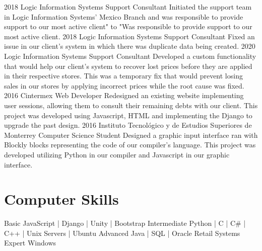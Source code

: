 \documentclass[]{twentysecondcv}
\begin{document}
\begin{twenty}
  \twentyitem
    {2018}
    {Logic Information Systems}
    {Support Consultant}
    {Initiated the support team in Logic Information Systems’ Mexico Branch and was responsible to provide support to our most active client" to "Was responsible to provide support to our most active client.}
  \twentyitem
    {2018}
    {Logic Information Systems}
    {Support Consultant}
    {Fixed an issue in our client’s system in which there was duplicate data being created.}
\twentyitem
    {2020}
    {Logic Information Systems}
    {Support Consultant}
    {Developed a custom functionality that would help our client’s system to recover lost prices before they are applied in their respective stores. This was a temporary fix that would prevent losing sales in our stores by applying incorrect prices while the root cause was fixed.}
\twentyitem
    {2016}
    {Cintermex}
    {Web Developer}
    {Redesigned an existing website implementing user sessions, allowing them to consult their remaining debts with our client. This project was developed using Javascript, HTML and implementing the Django to upgrade the past design.}
\twentyitem
    {2016}
    {Instituto Tecnológico y de Estudios Superiores de Monterrey}
    {Computer Science Student}
    {Designed a graphic input interface ran with Blockly blocks representing the code of our compiler's language. This project was developed utilizing Python in our compiler and Javascript in our graphic interface.}
\end{twenty}

\section{Computer Skills}

\begin{twentyshort}
  \twentyitemshort
    {Basic}
    {   JavaScript | Django | Unity | Bootstrap}
  \twentyitemshort
    {Intermediate}
    {   Python | C | C\# | C++ | Unix Servers | Ubuntu}
  \twentyitemshort
    {Advanced}
    {   Java | SQL | Oracle Retail Systems}
  \twentyitemshort
    {Expert}
    {   Windows}
\end{twentyshort}


\end{document}

